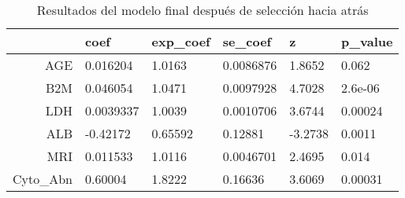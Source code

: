 \begin{table}[ht]
\centering
\begin{tabular}{rlllll}
  \hline
 & coef & exp\_coef & se\_coef & z & p\_value \\ 
  \hline
AGE & 0.016204 & 1.0163 & 0.0086876 & 1.8652 & 0.062 \\ 
  B2M & 0.046054 & 1.0471 & 0.0097928 & 4.7028 & 2.6e-06 \\ 
  LDH & 0.0039337 & 1.0039 & 0.0010706 & 3.6744 & 0.00024 \\ 
  ALB & -0.42172 & 0.65592 & 0.12881 & -3.2738 & 0.0011 \\ 
  MRI & 0.011533 & 1.0116 & 0.0046701 & 2.4695 & 0.014 \\ 
  Cyto\_Abn & 0.60004 & 1.8222 & 0.16636 & 3.6069 & 0.00031 \\ 
   \hline
\end{tabular}
\caption{Resultados del modelo final después de selección hacia atrás} 
\end{table}
